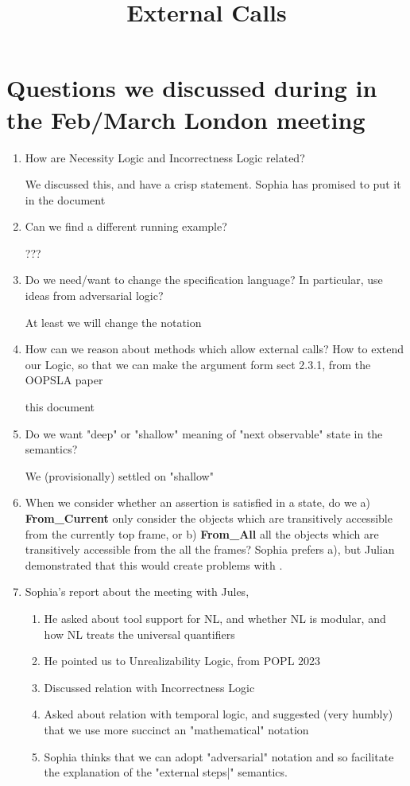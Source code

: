 \documentclass[11pt]{article} %
\title{External Calls}
\date{} %
\theoremstyle{definition}
\begin{document}
\maketitle

\section{Questions we discussed during in the Feb/March London meeting}

\begin{enumerate}
\item
How are Necessity Logic and Incorrectness Logic related?

We discussed this, and have a crisp statement. Sophia has promised to put it in the document
\item
Can we find a different running example?

??? 
\item
Do we need/want to change  the specification language? In particular, use ideas from adversarial logic?

At least we will change the notation
\item
How can we reason about methods which allow external calls? 
How to extend our Logic, so that we can make the argument form sect 2.3.1, from the OOPSLA paper


this document

\item
Do we want "deep" or "shallow" meaning of "next observable" state in the semantics?

We (provisionally) settled on "shallow"

\item
When we consider whether an assertion is satisfied in a state, do we a) \textbf{From\_Current} only consider the objects which are transitively accessible from the currently top frame, or b)  \textbf{From\_All} all the objects which are transitively accessible from the all the frames? Sophia prefers a), but Julian demonstrated that this would create problems with .
\item
Sophia's report about the meeting with Jules, 
\begin{enumerate}
\item 
He asked about tool support for NL, and whether NL is modular, and how NL treats the universal quantifiers 
\item
He pointed us to Unrealizability  Logic, from POPL 2023
\item
Discussed relation with Incorrectness Logic
\item
Asked about relation with temporal logic, and suggested (very humbly) that we use more succinct an "mathematical" notation
\item
Sophia thinks that we can adopt "adversarial" notation and so facilitate the explanation of the "external steps|" semantics.
\end{enumerate}
\end{enumerate}
\end{document}

